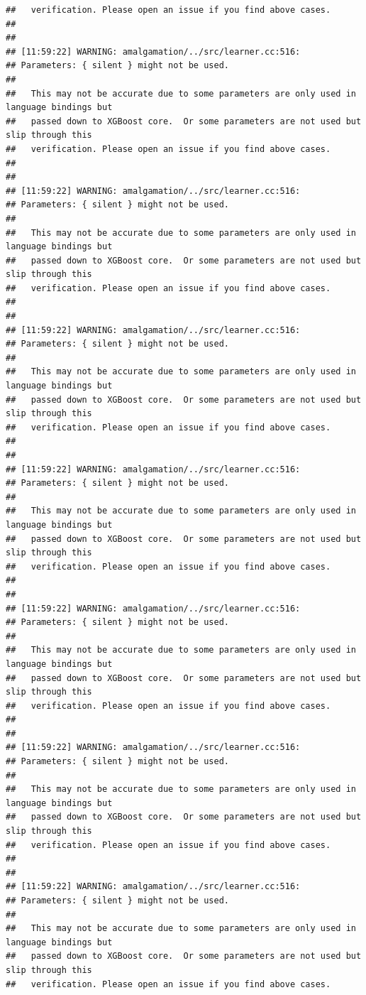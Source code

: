 \documentclass[AMS,STIX2COL]{WileyNJD-v2}\usepackage[]{graphicx}\usepackage[]{color}
\makeatletter
\newenvironment{kframe}{%
 \def\at@end@of@kframe{}%
 \ifinner\ifhmode%
  \def\at@end@of@kframe{\end{minipage}}%
  \begin{minipage}{\columnwidth}%
 \fi\fi%
 \def\FrameCommand##1{\hskip\@totalleftmargin \hskip-\fboxsep
 \colorbox{shadecolor}{##1}\hskip-\fboxsep
     \hskip-\linewidth \hskip-\@totalleftmargin \hskip\columnwidth}%
 \MakeFramed {\advance\hsize-\width
   \@totalleftmargin\z@ \linewidth\hsize
   \@setminipage}}%
 {\par\unskip\endMakeFramed%
 \at@end@of@kframe}
\newenvironment{knitrout}{}{} %
\makeatother
\begin{document}
\begin{knitrout}
\begin{kframe}
\begin{verbatim}
##   verification. Please open an issue if you find above cases.
## 
## 
## [11:59:22] WARNING: amalgamation/../src/learner.cc:516: 
## Parameters: { silent } might not be used.
## 
##   This may not be accurate due to some parameters are only used in language bindings but
##   passed down to XGBoost core.  Or some parameters are not used but slip through this
##   verification. Please open an issue if you find above cases.
## 
## 
## [11:59:22] WARNING: amalgamation/../src/learner.cc:516: 
## Parameters: { silent } might not be used.
## 
##   This may not be accurate due to some parameters are only used in language bindings but
##   passed down to XGBoost core.  Or some parameters are not used but slip through this
##   verification. Please open an issue if you find above cases.
## 
## 
## [11:59:22] WARNING: amalgamation/../src/learner.cc:516: 
## Parameters: { silent } might not be used.
## 
##   This may not be accurate due to some parameters are only used in language bindings but
##   passed down to XGBoost core.  Or some parameters are not used but slip through this
##   verification. Please open an issue if you find above cases.
## 
## 
## [11:59:22] WARNING: amalgamation/../src/learner.cc:516: 
## Parameters: { silent } might not be used.
## 
##   This may not be accurate due to some parameters are only used in language bindings but
##   passed down to XGBoost core.  Or some parameters are not used but slip through this
##   verification. Please open an issue if you find above cases.
## 
## 
## [11:59:22] WARNING: amalgamation/../src/learner.cc:516: 
## Parameters: { silent } might not be used.
## 
##   This may not be accurate due to some parameters are only used in language bindings but
##   passed down to XGBoost core.  Or some parameters are not used but slip through this
##   verification. Please open an issue if you find above cases.
## 
## 
## [11:59:22] WARNING: amalgamation/../src/learner.cc:516: 
## Parameters: { silent } might not be used.
## 
##   This may not be accurate due to some parameters are only used in language bindings but
##   passed down to XGBoost core.  Or some parameters are not used but slip through this
##   verification. Please open an issue if you find above cases.
## 
## 
## [11:59:22] WARNING: amalgamation/../src/learner.cc:516: 
## Parameters: { silent } might not be used.
## 
##   This may not be accurate due to some parameters are only used in language bindings but
##   passed down to XGBoost core.  Or some parameters are not used but slip through this
##   verification. Please open an issue if you find above cases.

\end{verbatim}
\end{kframe}
\end{knitrout}
\end{document}
